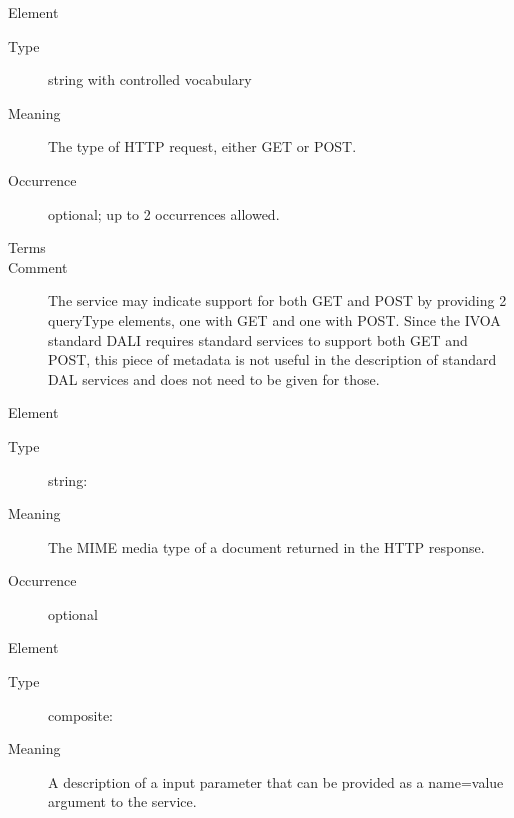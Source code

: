 \documentclass[11pt,a4paper]{ivoa}
\begin{document}
\begin{generated}
\begingroup\small\begin{bigdescription}\item[Element \xmlel{queryType}]
\begin{description}
\item[Type] string with controlled vocabulary
\item[Meaning] 
                       The type of HTTP request, either GET or POST.
                     
\item[Occurrence] optional; up to 2 occurrences allowed.

\item[Terms]\hfil
\begin{longtermsdescription}
\item[GET]
\item[POST]
\end{longtermsdescription}
\item[Comment] 
                       The service may indicate support for both GET
                       and POST by providing 2 queryType elements, one
                       with GET and one with POST.  Since the IVOA standard
                       DALI requires standard services to support both
                       GET and POST, this piece of metadata is not
                       useful in the description of standard DAL services
                       and does not need to be given for those.
                     

\end{description}
\item[Element \xmlel{resultType}]
\begin{description}
\item[Type] string: 
\item[Meaning] 
                       The MIME media type of a document returned in 
                       the HTTP response.
                     
\item[Occurrence] optional

\end{description}
\item[Element \xmlel{param}]
\begin{description}
\item[Type] composite: 
\item[Meaning] 
                       A description of a input parameter that can be 
                       provided as a name=value argument to the service.  
                    

\end{description}
\end{bigdescription}
\end{generated}
\end{document}
